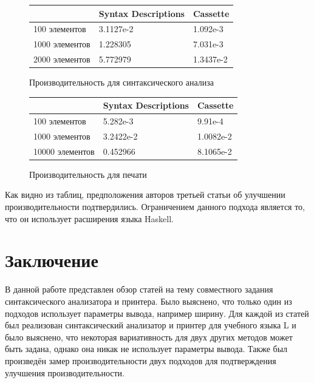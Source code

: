 \begin{figure}[ht]
\centering
\begin{center}
    \begin{tabular}{ | p{3cm} | p{3cm} | p{3cm} |}
    \hline
                   & Syntax Descriptions &  Cassette \\ \hline
    100 элементов  & 3.1127e-2           & 1.092e-3  \\ \hline
    1000 элементов & 1.228305            & 7.031e-3  \\ \hline
    2000 элементов & 5.772979            & 1.3437e-2 \\
    \hline
    \end{tabular}
\end{center}
\caption{Производительность для синтаксического анализа}
\label{syntperf}
\end{figure}

\begin{figure}[ht]
\centering
\begin{center}
    \begin{tabular}{ | p{3cm} | p{3cm} | p{3cm} |}
    \hline
                    & Syntax Descriptions &  Cassette \\ \hline
    100 элементов   & 5.282e-3            & 9.91e-4   \\ \hline
    1000 элементов  & 3.2422e-2           & 1.0082e-2 \\ \hline
    10000 элементов & 0.452966            & 8.1065e-2 \\
    \hline
    \end{tabular}
\end{center}
\caption{Производительность для печати}
\label{ppperf}
\end{figure}

Как видно из таблиц, предположения авторов третьей статьи об улучшении производительности подтвердились.
Ограничением данного подхода является то, что он использует расширения языка Haskell.

\section*{Заключение}

В данной работе представлен обзор статей на тему совместного задания синтаксического 
анализатора и принтера. Было выяснено, что только один из подходов использует 
параметры вывода, например ширину. Для каждой из статей был реализован синтаксический 
анализатор и принтер для учебного языка L и было выяснено, что некоторая вариативность 
для двух других методов может быть задана, однако она никак не использует параметры вывода. 
Также был произведён замер производительности двух подходов для подтверждения улучшения 
производительности.

